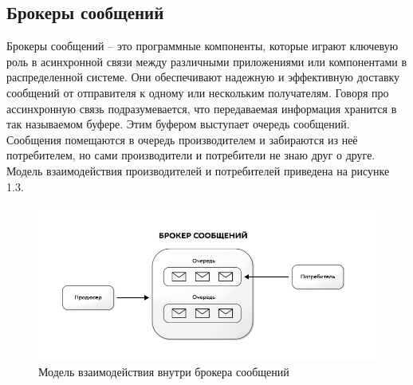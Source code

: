 
\subsection{Брокеры сообщений}\label{subsec:domain:message-brokers}
Брокеры сообщений -- это программные компоненты, которые играют ключевую роль в асинхронной связи между различными приложениями или компонентами в распределенной системе.
Они обеспечивают надежную и эффективную доставку сообщений от отправителя к одному или нескольким получателям.
Говоря про ассинхронную связь подразумевается, что передаваемая информация хранится в так называемом буфере.
Этим буфером выступает очередь сообщений.
Сообщения помещаются в очередь производителем и забираются из неё потребителем, но сами производители и потребители не знаю друг о друге.
Модель взаимодействия производителей и потребителей приведена на рисунке 1.3.

\begin{figure}[ht]
    \centering
    \includegraphics[width=.6\linewidth]{images/mb_interaction_model}
    \caption{Модель взаимодействия внутри брокера сообщений}
    \label{fig:domain:mb-interaction-model}
\end{figure}

